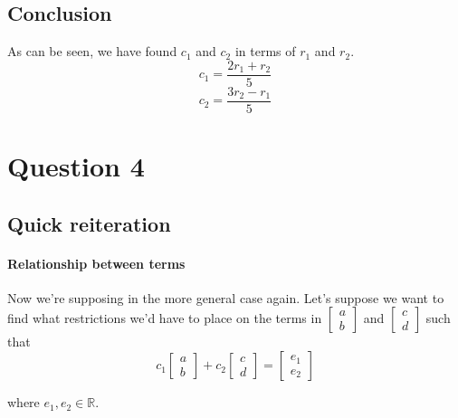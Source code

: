 \documentclass{article}
\begin{document}
    \subsection{Conclusion}
        As can be seen, we have found $c_1$ and $c_2$ in terms of $r_1$ and $r_2$.
        \[c_1 = \frac{2r_1 + r_2}{5}\]
        \[c_2 = \frac{3r_2 - r_1}{5}\]





\section{Question 4}
    \subsection{Quick reiteration}
        \paragraph{Relationship between terms}
        Now we're supposing in the more general case again. Let's suppose we want to find what restrictions we'd have
        to place on the terms in 
        $\begin{bmatrix}a \\ b\end{bmatrix}$ and $\begin{bmatrix}c \\ d\end{bmatrix}$ such that
        \[c_1\begin{bmatrix}a \\ b\end{bmatrix} + c_2\begin{bmatrix}c \\ d\end{bmatrix} = \begin{bmatrix}e_1 \\ e_2\end{bmatrix}\]
        \begin{center}where $e_1, e_2 \in \mathbb{R}$.\end{center}
\end{document}
